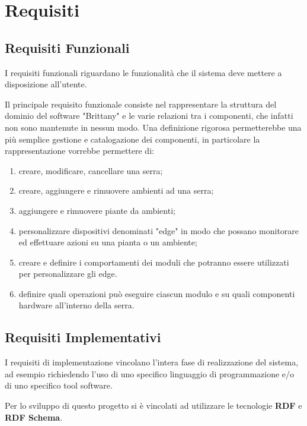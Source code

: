 \section{Requisiti}

\subsection{Requisiti Funzionali}

I requisiti funzionali riguardano le funzionalità che il sistema deve mettere a disposizione all’utente.

\noindent Il principale requisito funzionale consiste nel rappresentare la struttura del dominio del software "Brittany" e le varie relazioni tra i componenti, che infatti non sono mantenute in nessun modo. Una definizione rigorosa permetterebbe una più semplice gestione e catalogazione dei componenti, in particolare la rappresentazione vorrebbe permettere di:
\begin{enumerate}
	\item creare, modificare, cancellare una serra;
	\item creare, aggiungere e rimuovere ambienti ad una serra;
	\item aggiungere e rimuovere piante da ambienti;
	\item personalizzare dispositivi denominati "edge" in modo che possano monitorare ed effettuare azioni su una pianta o un ambiente;
	\item creare e definire i comportamenti dei moduli che potranno essere utilizzati per personalizzare gli edge.
	\item definire quali operazioni può eseguire ciascun modulo e su quali componenti hardware all'interno della serra.
\end{enumerate}

\subsection{Requisiti Implementativi}

I requisiti di implementazione vincolano l’intera fase di realizzazione del sistema, ad esempio richiedendo l’uso di uno specifico linguaggio di programmazione e/o di uno specifico tool software.

\noindent Per lo sviluppo di questo progetto si è vincolati ad utilizzare le tecnologie \textbf{RDF} e \textbf{RDF Schema}.
